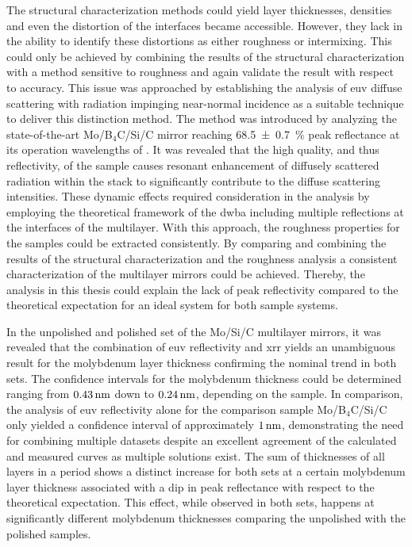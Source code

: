 The structural characterization methods could yield layer thicknesses, densities and even the distortion of the interfaces became accessible. However, they lack in the ability to identify these distortions as either roughness or intermixing. This could only be achieved by combining the results of the structural characterization with a method sensitive to roughness and again validate the result with respect to accuracy. This issue was approached by establishing the analysis of \gls{euv} diffuse scattering with radiation impinging near-normal incidence as a suitable technique to deliver this distinction method. The method was introduced by analyzing the state-of-the-art Mo/B$_4$C/Si/C mirror reaching \SI{68.5 \pm 0.7}{\percent} peak reflectance at its operation wavelengths of . It was revealed that the high quality, and thus reflectivity, of the sample causes resonant enhancement of diffusely scattered radiation within the stack to significantly contribute to the diffuse scattering intensities. These dynamic effects required consideration in the analysis by employing the theoretical framework of the \glsdesc{dwba} including multiple reflections at the interfaces of the multilayer. With this approach, the roughness properties for the samples could be extracted consistently. By comparing and combining the results of the structural characterization and the roughness analysis a consistent characterization of the multilayer mirrors could be achieved. Thereby, the analysis in this thesis could explain the lack of peak reflectivity compared to the theoretical expectation for an ideal system for both sample systems.

In the unpolished and polished set of the Mo/Si/C multilayer mirrors, it was revealed that the combination of \gls{euv} reflectivity and \glsdesc{xrr} yields an unambiguous result for the molybdenum layer thickness confirming the nominal trend in both sets. The confidence intervals for the molybdenum thickness could be determined ranging from $\nm{0.43}$ down to $\nm{0.24}$, depending on the sample. In comparison, the analysis of \gls{euv} reflectivity alone for the comparison sample Mo/B$_4$C/Si/C only yielded a confidence interval of approximately $\nm{1}$, demonstrating the need for combining multiple datasets despite an excellent agreement of the calculated and measured curves as multiple solutions exist.
The sum of thicknesses of all layers in a period shows a distinct increase for both sets at a certain molybdenum layer thickness associated with a dip in peak reflectance with respect to the theoretical expectation. This effect, while observed in both sets, happens at significantly different molybdenum thicknesses comparing the unpolished with the polished samples.

